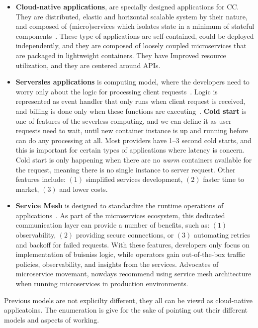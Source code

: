 \begin{itemize}
	\item \textbf{Cloud-native applications}, are specially designed applications for CC. They are distributed, elastic and horizontal scalable system by their nature, and composed of (micro)services which isolates state in a minimum of stateful components~\cite{KratzkeQ17}. These type of applications are self-contained, could be deployed independently, and they are composed of loosely coupled microservices that are packaged in lightweight containers. They have Improved resource utilization, and they are centered around APIs.
	\item \textbf{Serversles applications} is computing model, where the developers need to worry only about the logic for processing client requests~\cite{AdzicC17}. Logic is represented as event handler that only runs when client request is received, and billing is done only when these functions are executing~\cite{AdzicC17}. \textbf{Cold start} is one of features of the severless computing, and we can define it as user requests need to wait, until new container instance is up and running before can do any processing at all. Most providers have 1–3 second cold starts, and this is important for certain types of applications where latency is concern. Cold start is only happening when there are no \textit{warm} containers available for the request, meaning there is no single instance to server request. Other features include: $(1)$ simplified services development, $(2)$ faster time to market, $(3)$ and lower costs.
	\item \textbf{Service Mesh} is designed to standardize the runtime operations of applications~\cite{LiLGZH19}. As part of the microservices ecosystem,
	this dedicated communication layer can provide a number of benefits, such as: $(1)$ observability, $(2)$ providing secure connections, or $(3)$ automating retries and backoff for failed requests. With these features, developers only focus on implementation of buisniss logic, while operators gain out-of-the-box traffic policies, observability, and insights from the services. Advocates of microservice movemant, nowdays recommend using service mesh architecture when running microservices in production environments.
\end{itemize}

Previous models are not explicilty different, they all can be viewd as cloud-native applicatoins. The enumeration is give for the sake of pointing out their different models and aspects of working.

